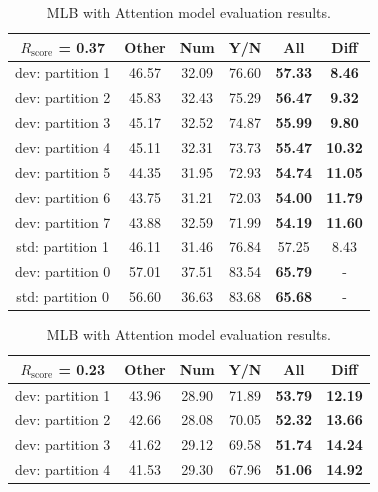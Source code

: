 \documentclass[letterpaper]{article}
\newcommand{\rscore}{}\def\rscore/{$R_{\text{score}}$}
\begin{document}
\begin{table}
\begin{subtable}{0.49\linewidth}
		\begin{adjustbox}{width=0.46\columnwidth}
\begin{tabular}{c | c c c c | c}
			\rscore/ = 0.37  & Other & Num   & Y/N   & All            & Diff           \\ [0.5ex]
			\hline
			dev: partition 1 & 46.57 & 32.09 & 76.60 & \textbf{57.33} & \textbf{8.46}  \\
			dev: partition 2 & 45.83 & 32.43 & 75.29 & \textbf{56.47} & \textbf{9.32}  \\
			dev: partition 3 & 45.17 & 32.52 & 74.87 & \textbf{55.99} & \textbf{9.80}  \\
			dev: partition 4 & 45.11 & 32.31 & 73.73 & \textbf{55.47} & \textbf{10.32} \\
			dev: partition 5 & 44.35 & 31.95 & 72.93 & \textbf{54.74} & \textbf{11.05} \\
			dev: partition 6 & 43.75 & 31.21 & 72.03 & \textbf{54.00} & \textbf{11.79} \\
			dev: partition 7 & 43.88 & 32.59 & 71.99 & \textbf{54.19} & \textbf{11.60} \\
			\hline
			std: partition 1 & 46.11 & 31.46 & 76.84 & 57.25          & 8.43           \\
			\hline
			dev: partition 0 & 57.01 & 37.51 & 83.54 & \textbf{65.79} & -              \\
			std: partition 0 & 56.60 & 36.63 & 83.68 & \textbf{65.68} & -              \\
			\hline
		\end{tabular}
\end{adjustbox}
		\caption{MLB with Attention model evaluation results.}
	\end{subtable}
	\begin{subtable}{0.49\linewidth}
		\begin{adjustbox}{width=0.46\columnwidth}
\begin{tabular}{c | c c c c | c}
			\rscore/ = 0.23  & Other & Num   & Y/N   & All            & Diff           \\ [0.5ex]
			\hline
			dev: partition 1 & 43.96 & 28.90 & 71.89 & \textbf{53.79} & \textbf{12.19} \\
			dev: partition 2 & 42.66 & 28.08 & 70.05 & \textbf{52.32} & \textbf{13.66} \\
			dev: partition 3 & 41.62 & 29.12 & 69.58 & \textbf{51.74} & \textbf{14.24} \\
			dev: partition 4 & 41.53 & 29.30 & 67.96 & \textbf{51.06} & \textbf{14.92} \\

\end{tabular}
\end{adjustbox}
\end{subtable}
\end{table}
\end{document}
